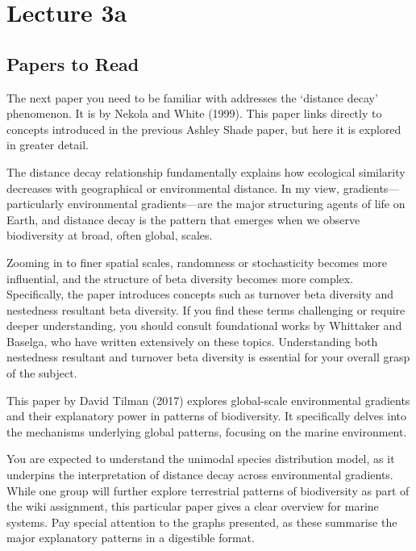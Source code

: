 \documentclass[
  11pt,
]{book}
\begin{document}
\chapter*{Lecture 3a}\label{lecture-3a}

\section{Papers to Read}\label{papers-to-read-1}

The next paper you need to be familiar with addresses the `distance
decay' phenomenon. It is by Nekola and White (1999). This paper links
directly to concepts introduced in the previous Ashley Shade paper, but
here it is explored in greater detail.

The distance decay relationship fundamentally explains how ecological
similarity decreases with geographical or environmental distance. In my
view, gradients---particularly environmental gradients---are the major
structuring agents of life on Earth, and distance decay is the pattern
that emerges when we observe biodiversity at broad, often global,
scales.

Zooming in to finer spatial scales, randomness or stochasticity becomes
more influential, and the structure of beta diversity becomes more
complex. Specifically, the paper introduces concepts such as turnover
beta diversity and nestedness resultant beta diversity. If you find
these terms challenging or require deeper understanding, you should
consult foundational works by Whittaker and Baselga, who have written
extensively on these topics. Understanding both nestedness resultant and
turnover beta diversity is essential for your overall grasp of the
subject.

This paper by David Tilman (2017) explores global-scale environmental
gradients and their explanatory power in patterns of biodiversity. It
specifically delves into the mechanisms underlying global patterns,
focusing on the marine environment.

You are expected to understand the unimodal species distribution model,
as it underpins the interpretation of distance decay across
environmental gradients. While one group will further explore
terrestrial patterns of biodiversity as part of the wiki assignment,
this particular paper gives a clear overview for marine systems. Pay
special attention to the graphs presented, as these summarise the major
explanatory patterns in a digestible format.
\end{document}
